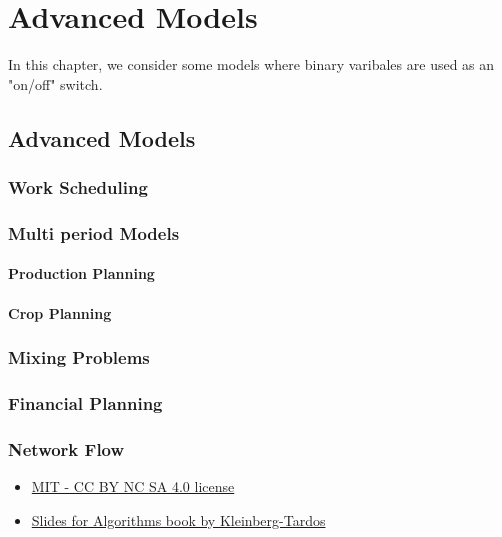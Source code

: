 \chapter{Advanced Models}
In this chapter, we consider some models where binary varibales are used as an "on/off" switch.  








\section{Advanced Models}
\subsection{Work Scheduling}
\subsection{Multi period Models}

\subsubsection{Production Planning}

\subsubsection{Crop Planning}


\subsection{Mixing Problems}

\subsection{Financial Planning}





\subsection{Network Flow}
\begin{resource}
\begin{itemize}
\item \href{https://ocw.mak.ac.ug/courses/electrical-engineering-and-computer-science/6-046j-design-and-analysis-of-algorithms-spring-2012/lecture-notes/MIT6_046JS12_lec13.pdf}{MIT - CC BY NC SA 4.0 license}
\item \href{https://www.cs.princeton.edu/~wayne/kleinberg-tardos/pearson/}{Slides for Algorithms book by Kleinberg-Tardos}
\end{itemize}
\end{resource}





